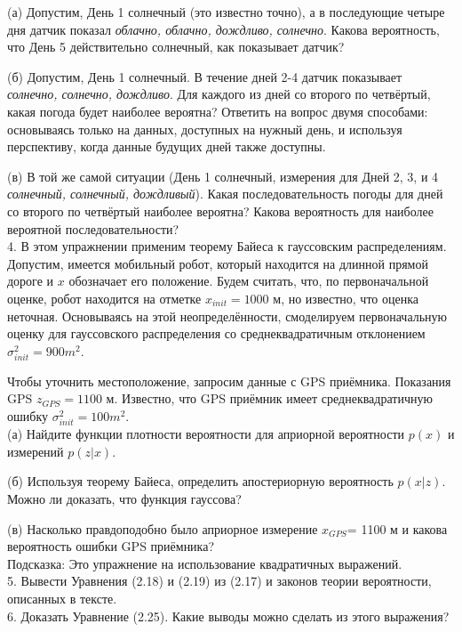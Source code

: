 \documentclass[10pt,a4paper]{article}
\begin{document}
 (а) Допустим, День 1 солнечный (это известно точно), а в последующие четыре дня датчик показал \textit{облачно, облачно, дождливо, солнечно}. Какова вероятность, что День 5 действительно солнечный, как показывает датчик?
 
 (б) Допустим, День 1 солнечный. В течение дней 2-4 датчик показывает \textit{солнечно, солнечно, дождливо}. Для каждого из дней со второго по четвёртый, какая погода будет наиболее вероятна? Ответить на вопрос двумя способами: основываясь только на данных, доступных на нужный день, и используя перспективу, когда данные будущих дней также доступны.
  
 (в) В той же самой ситуации (День 1 солнечный, измерения для Дней 2, 3, и 4 \textit{солнечный, солнечный, дождливый}). Какая последовательность погоды для дней со второго по четвёртый наиболее вероятна? Какова вероятность для наиболее вероятной последовательности?\\
  
 4. В этом упражнении применим теорему Байеса к гауссовским распределениям. Допустим, имеется мобильный робот, который находится на длинной прямой дороге и $x$ обозначает его положение. Будем считать, что, по первоначальной оценке, робот находится на отметке $x_{init}=1000$  м, но известно, что оценка неточная. Основываясь на этой неопределённости, смоделируем первоначальную оценку для гауссовского распределения со среднеквадратичным отклонением $\sigma_{init}^2= 900 m^2$.
 
 Чтобы уточнить местоположение, запросим данные с GPS приёмника. Показания GPS $z_{GPS}= 1100$ м. Известно, что GPS приёмник имеет среднеквадратичную ошибку $\sigma_{init}^2 = 100 m^2$.\\
 
 (а)  Найдите функции плотности вероятности для априорной вероятности $p(x)$ и измерений $p(z | x)$.
  
 (б) Используя теорему Байеса, определить апостериорную вероятность $p(x | z)$. Можно ли доказать, что функция гауссова?
 
 (в) Насколько правдоподобно было априорное измерение $x_{GPS}$= 1100 м и какова вероятность ошибки GPS приёмника?\\
 Подсказка: Это упражнение на использование квадратичных выражений.\\

 5. Вывести Уравнения (2.18) и (2.19) из (2.17) и законов теории вероятности, описанных в тексте.\\

 6. Доказать Уравнение (2.25). Какие выводы можно сделать из этого выражения?\\
  
\end{document}

